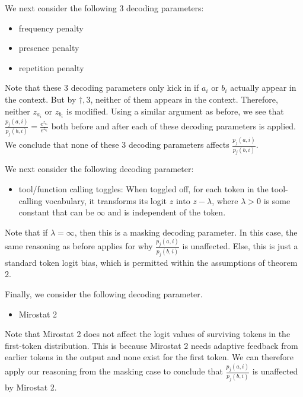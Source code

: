 \documentclass{article}
\begin{document}
We next consider the following 3 decoding parameters:
\begin{itemize}
\item frequency penalty
\item presence penalty
\item repetition penalty
\end{itemize}

Note that these 3 decoding parameters only kick in if $\displaystyle a_{i}$ or $\displaystyle b_{i}$ actually appear in the context. But by $\displaystyle \dagger ,3$, neither of them appears in the context. Therefore, neither $\displaystyle z_{a_{i}}$ or $\displaystyle z_{b_{i}}$ is modified. Using a similar argument as before, we see that $\displaystyle \frac{p_{j}\left( a,i\right)}{p_{j}\left( b,i\right)} =\frac{e^{z_{a_{i}}}}{e^{z_{b_{i}}}}$ both before and after each of these decoding parameters is applied. We conclude that none of these 3 decoding parameters affects $\displaystyle \frac{p_{j}\left( a,i\right)}{p_{j}\left( b,i\right)}$.



We next consider the following decoding parameter:
\begin{itemize}
\item tool/function calling toggles: When toggled off, for each token in the tool-calling vocabulary, it transforms its logit $\displaystyle z$ into $\displaystyle z-\lambda $, where $\displaystyle \lambda  >0$ is some constant that can be $\displaystyle \infty $ and is independent of the token.
\end{itemize}

Note that if $\displaystyle \lambda =\infty $, then this is a masking decoding parameter. In this case, the same reasoning as before applies for why $\displaystyle \frac{p_{j}\left( a,i\right)}{p_{j}\left( b,i\right)}$ is unaffected. Else, this is just a standard token logit bias, which is permitted within the assumptions of theorem 2.



Finally, we consider the following decoding parameter.
\begin{itemize}
\item Mirostat 2
\end{itemize}

Note that Mirostat 2 does not affect the logit values of surviving tokens in the first-token distribution. This is because Mirostat 2 needs adaptive feedback from earlier tokens in the output and none exist for the first token. We can therefore apply our reasoning from the masking case to conclude that $\displaystyle \frac{p_{j}\left( a,i\right)}{p_{j}\left( b,i\right)}$ is unaffected by Mirostat 2.
\end{document}
